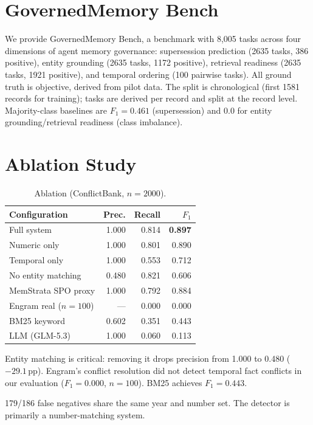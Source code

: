 \documentclass{llncs}
\begin{document}
\section{GovernedMemory Bench}


We provide GovernedMemory Bench, a benchmark with 8{,}005 tasks across four dimensions of agent memory governance: supersession prediction (2{}635 tasks, 386 positive), entity grounding (2{}635 tasks, 1{}172 positive), retrieval readiness (2{}635 tasks, 1{}921 positive), and temporal ordering (100 pairwise tasks). All ground truth is objective, derived from pilot data. The split is chronological (first 1{}581 records for training); tasks are derived per record and split at the record level. Majority-class baselines are $F_1{=}0.461$ (supersession) and 0.0 for entity grounding/retrieval readiness (class imbalance).

\section{Ablation Study}

\begin{table}[h]
\centering
\caption{Ablation (ConflictBank, $n{=}2{}000$).}
\begin{tabular}{lrrr}
\toprule
Configuration & Prec. & Recall & $F_1$ \\
\midrule
Full system & 1.000 & 0.814 & \textbf{0.897} \\
Numeric only & 1.000 & 0.801 & 0.890 \\
Temporal only & 1.000 & 0.553 & 0.712 \\
No entity matching & 0.480 & 0.821 & 0.606 \\
MemStrata SPO proxy & 1.000 & 0.792 & 0.884 \\
Engram real ($n{=}100$) & --- & 0.000 & 0.000 \\
BM25 keyword & 0.602 & 0.351 & 0.443 \\
LLM (GLM-5.3) & 1.000 & 0.060 & 0.113 \\
\bottomrule
\end{tabular}
\end{table}

Entity matching is critical: removing it drops precision from 1.000 to 0.480 ($-29.1$\,pp). Engram's conflict resolution did not detect temporal fact conflicts in our evaluation ($F_1{=}0.000$, $n{=}100$). BM25 achieves $F_1{=}0.443$.

179/186 false negatives share the same year and number set. The detector is primarily a number-matching system.
\end{document}
